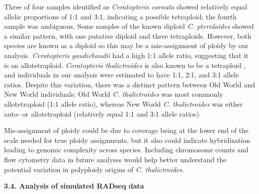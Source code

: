 \documentclass[12pt]{article}
\begin{document}
\begin{flushleft}
Three of four samples identified as \textit{Ceratopteris cornuta} showed relatively equal allelic proportions of 1:1 and 3:1, indicating a possible tetraploid; the fourth sample was ambiguous. Some samples of the known diploid \textit{C. pteridoides} showed a similar pattern, with one putative diploid and three tetraploids. However, both species are known as a diploid so this may be a mis-assignment of ploidy by our analysis. \textit{Ceratopteris gaudichaudii} had a high 1:1 allele ratio, suggesting that it is an allotetraploid. \textit{Ceratopteris thalictroides} is also known to be a tetraploid \autocite{LloydTax1974, Masuyama2010}, and individuals in our analysis were estimated to have 1:1, 2:1, and 3:1 allele ratios. Despite this variation, there was a distinct pattern between Old World and New World individuals: Old World \textit{C. thalictroides} was most commonly allotetraploid (1:1 allele ratio), whereas New World \textit{C. thalictroides} was either auto- or allotetraploid (relatively equal 1:1 and 3:1 allele ratios). 

Mis-assignment of ploidy could be due to coverage being at the lower end of the scale needed for true ploidy assignments, but it also could indicate hybridization leading to genomic complexity across species. Including chromosome counts and flow cytometry data in future analyses would help better understand the potential variation in polyploidy origins of \textit{C. thalictroides}.

\textbf{3.4. Analysis of simulated RADseq data}


\end{flushleft}
\end{document}
